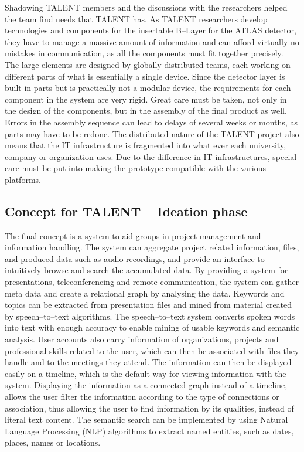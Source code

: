 \documentclass[english,12pt,a4paper,pdftex]{article}
\begin{document}
Shadowing TALENT members and the discussions with the researchers helped the team find needs that TALENT has. As TALENT researchers develop technologies and components for the insertable B--Layer for the ATLAS detector, they have to manage a massive amount of information and can afford virtually no mistakes in communication, as all the components must fit together precisely. The large elements are designed by globally distributed teams, each working on different parts of what is essentially a single device. Since the detector layer is built in parts but is practically not a modular device, the requirements for each component in the system are very rigid. Great care must be taken, not only in the design of the components, but in the assembly of the final product as well. Errors in the assembly sequence can lead to delays of several weeks or months, as parts may have to be redone. The distributed nature of the TALENT project also means that the IT infrastructure is fragmented into what ever each university, company or organization uses. Due to the difference in IT infrastructures, special care must be put into making the prototype compatible with the various platforms. 


\subsection{Concept for TALENT -- Ideation phase}


The final concept is a system to aid groups in project management and information handling. The system can aggregate project related information, files, and produced data such as audio recordings, and provide an interface to intuitively browse and search the accumulated data. By providing a system for presentations, teleconferencing and remote communication, the system can gather meta data and create a relational graph by analysing the data. Keywords and topics can be extracted from presentation files and mined from material created by speech--to--text algorithms. The speech--to--text system converts spoken words into text with enough accuracy to enable mining of usable keywords and semantic analysis. User accounts also carry information of organizations, projects and professional skills related to the user, which can then be associated with files they handle and to the meetings they attend. The information can then be displayed easily on a timeline, which is the default way for viewing information with the system. Displaying the information as a connected graph instead of a timeline, allows the user filter the information according to the type of connections or association, thus allowing the user to find information by its qualities, instead of literal text content. The semantic search can be implemented by using Natural Language Processing (NLP) algorithms to extract named entities, such as dates, places, names or locations.
\end{document}
